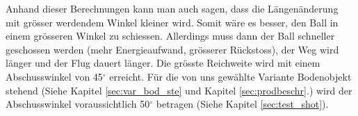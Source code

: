\noindent
Anhand dieser Berechnungen kann man auch sagen, dass die Längenänderung mit 
grösser werdendem Winkel kleiner wird. Somit wäre es besser, den Ball in einem 
grösseren Winkel zu schiessen. Allerdings muss dann der Ball schneller 
geschossen werden (mehr Energieaufwand, grösserer Rückstoss), der Weg wird 
länger und der Flug dauert länger. Die grösste Reichweite wird mit einem Abschusswinkel 
von 45$^\circ$ erreicht. Für die von uns gewählte Variante Bodenobjekt stehend (Siehe Kapitel
\ref{sec:var_bod_ste} und Kapitel \ref{sec:prodbeschr}.) wird der 
Abschusswinkel voraussichtlich 50$^\circ$ betragen (Siehe Kapitel \ref{sec:test_shot}).

